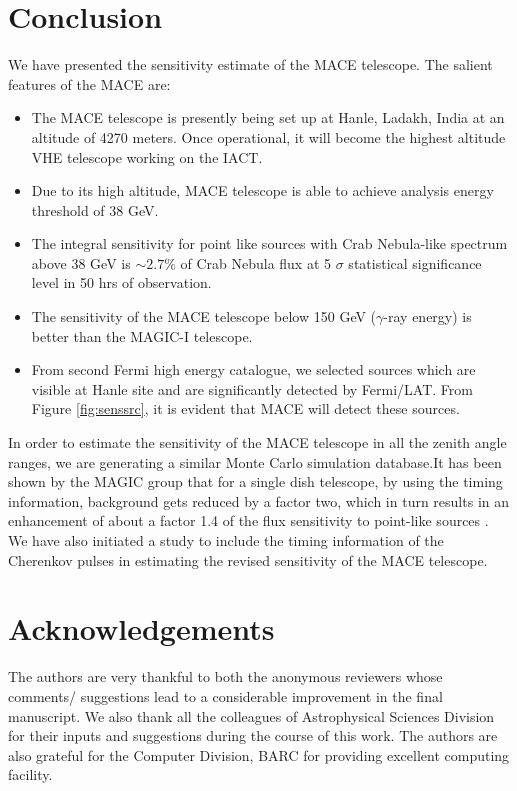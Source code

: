 \documentclass[preprint,12pt]{elsarticle}
\begin{document}
\section{Conclusion}
We have presented the sensitivity estimate of the MACE telescope. The salient features of the MACE are:
\begin{itemize}
\item The MACE telescope is presently being set up at Hanle, Ladakh, India at an altitude of 4270 meters. Once operational, it will become the highest 
altitude VHE telescope working on the IACT.

\item Due to its high altitude, MACE telescope is able to achieve analysis energy threshold of 38 GeV.

\item The integral sensitivity for point like sources with Crab Nebula-like spectrum 
above 38 GeV is $\sim 2.7\%$ of Crab Nebula flux at 5 $\sigma$ statistical 
significance level in 50 hrs of observation.

\item The sensitivity of the MACE telescope below 150 GeV ($\gamma$-ray energy) is better than the MAGIC-I telescope.

\item From second Fermi high energy catalogue, we selected sources which are visible at Hanle site and are significantly detected
by Fermi/LAT. From Figure \ref{fig:senssrc}, it is evident that MACE will detect these sources.
\end{itemize}

In order to estimate the sensitivity of the MACE telescope in all the zenith angle ranges, we are generating a similar 
Monte Carlo simulation database.It has been shown by the MAGIC group that for a single dish telescope, by using the 
timing information, background gets reduced by a factor two, which in turn results in an enhancement of about a factor 
1.4 of the flux sensitivity to point-like sources \cite{time}. We have also initiated a study to include the timing 
information of the Cherenkov pulses in estimating the revised sensitivity of the MACE telescope. 

\section*{Acknowledgements}
The authors are very thankful to both the anonymous reviewers whose comments/ suggestions lead to a considerable improvement in the final manuscript. We also thank all 
the colleagues of Astrophysical Sciences Division for their inputs and suggestions during the course of this work. The authors are also grateful for the Computer 
Division, BARC for providing excellent computing facility.
\end{document}
